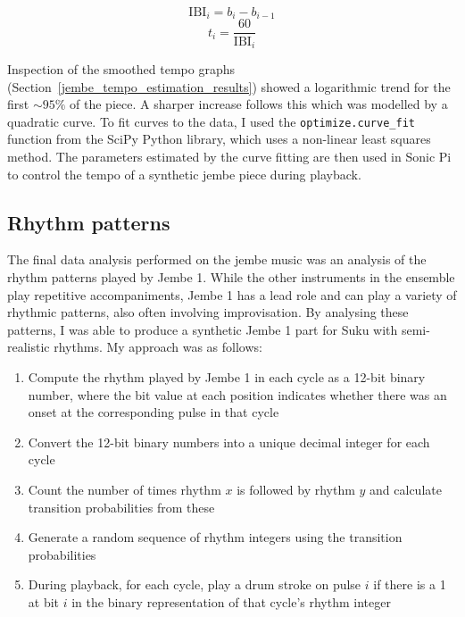 \documentclass[12pt,twoside,openright]{report}
\begin{document}
\begin{equation}
    \mathrm{IBI}_i = b_i - b_{i-1}
    \label{eq:ibi}
\end{equation}
\begin{equation}
    t_i = \frac{60}{\mathrm{IBI}_i}
    \label{eq:tempo}
\end{equation}

Inspection of the smoothed tempo graphs (Section~\ref{jembe_tempo_estimation_results}) showed a logarithmic trend for the first $\sim95\%$ of the piece. A sharper increase follows this which was
modelled by a quadratic curve. To fit curves to the data, I used the \verb'optimize.curve_fit' function from the SciPy Python library, which uses a non-linear least
squares method. The parameters estimated by the curve fitting are then used in Sonic Pi
to control the tempo of a synthetic jembe piece during playback.


\subsection{Rhythm patterns} \label{rhythm_patterns}

The final data analysis performed on the jembe music was an analysis of the
rhythm patterns played by Jembe 1. While the other instruments in the ensemble
play repetitive accompaniments, Jembe 1 has a lead role and can play a variety
of rhythmic patterns, also often involving improvisation. By analysing these
patterns, I was able to produce a synthetic Jembe 1 part for Suku with
semi-realistic rhythms. My approach was as follows:

\begin{enumerate}
    \item Compute the rhythm played by Jembe 1 in each cycle as a 12-bit binary number, where the bit value at each position indicates whether there was an onset at the corresponding pulse in that cycle
    \item Convert the 12-bit binary numbers into a unique decimal integer for each cycle
    \item Count the number of times rhythm $x$ is followed by rhythm $y$ and calculate transition probabilities from these
    \item Generate a random sequence of rhythm integers using the transition probabilities
    \item During playback, for each cycle, play a drum stroke on pulse $i$ if there is a 1 at bit $i$ in the binary representation of that cycle's rhythm integer
\end{enumerate}
\end{document}
